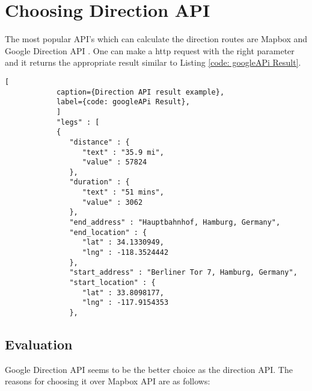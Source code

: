 \section{Choosing Direction API}  
        The most popular API's which can calculate the direction routes are Mapbox \cite{mapbox} 
        and Google Direction API \cite{googleDirecAPI}. One can make a http request with the 
        right parameter and it returns the appropriate result similar to Listing 
        \ref{code: googleAPi Result}.
        \begin{lstlisting}[
            caption={Direction API result example}, 
            label={code: googleAPi Result},
            ]
            "legs" : [
            {
               "distance" : {
                  "text" : "35.9 mi",
                  "value" : 57824
               },
               "duration" : {
                  "text" : "51 mins",
                  "value" : 3062
               },
               "end_address" : "Hauptbahnhof, Hamburg, Germany",
               "end_location" : {
                  "lat" : 34.1330949,
                  "lng" : -118.3524442
               },
               "start_address" : "Berliner Tor 7, Hamburg, Germany",
               "start_location" : {
                  "lat" : 33.8098177,
                  "lng" : -117.9154353
               },  
        \end{lstlisting}
    
        \subsection{Evaluation}
            Google Direction API seems to be the better choice as the 
            direction API.
            The reasons for choosing it over Mapbox API are as follows:

